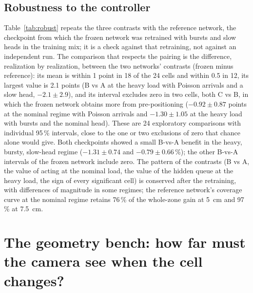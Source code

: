 \documentclass[11pt,a4paper]{article}
\begin{document}
\subsection{Robustness to the controller}\label{sec:robust}
Table~\ref{tab:robust} repeats the three contrasts with the reference network, the
checkpoint from which the frozen network was retrained with bursts and slow heads in the
training mix; it is a check against that retraining, not against an independent run.
The comparison that respects the pairing is the difference, realization by realization,
between the two networks' contrasts (frozen minus reference): its mean is within 1 point
in 18 of the 24 cells and within 0.5 in 12, its largest value is 2.1 points (B vs A at
the heavy load with Poisson arrivals and a slow head, $-2.1\pm2.9$), and its interval
excludes zero in two cells, both C vs B, in which the frozen network obtains more from
pre-positioning ($-0.92\pm0.87$ points at the nominal regime with Poisson arrivals and
$-1.30\pm1.05$ at the heavy load with bursts and the nominal head). These are 24
exploratory comparisons with individual 95\,\% intervals, close to the one or two
exclusions of zero that chance alone would give. Both checkpoints showed a small B-vs-A
benefit in the heavy, bursty, slow-head regime ($-1.31\pm0.74$ and $-0.79\pm0.66$\,\%);
the other B-vs-A intervals of the frozen network include zero. The pattern of the
contrasts (B vs A, the value of acting at the nominal load, the value of the hidden queue at the
heavy load, the sign of every significant cell) is conserved after the retraining, with
differences of magnitude in some regimes; the reference network's coverage curve at the
nominal regime retains 76\,\% of the whole-zone gain at 5~cm and 97\,\% at 7.5~cm.

\begin{table}[t]
\centering\small
\caption{Reference cell, robustness (a secondary analysis of the phase-4 data, added after the run): the reference network's contrasts (as
Table~\ref{tab:contrasts}) and the paired difference between the frozen and the
reference network's contrasts (frozen minus reference, per realization, points; negative
= the frozen network obtains more from the treatment). Bold: the interval excludes zero. Seeds 7000--7029, shared with the companion paper.}
\label{tab:robust}
\resizebox{\linewidth}{!}{}
\end{table}

\section{The geometry bench: how far must the camera see when the cell changes?}\label{sec:benchresults}
\end{document}
